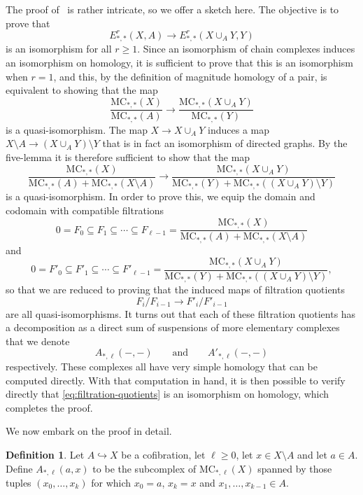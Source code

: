 \documentclass[a4paper, 11 pt, oneside, reqno]{amsart}
\numberwithin{lemma}{section}
\theoremstyle{definition}
\newtheorem{definition}[lemma]{Definition}
\newcommand{\MC}{\mathrm{MC}}
\begin{document}
The proof of~ is rather intricate, 
so we offer a sketch here. The objective is to prove that
\[
    E^r_{\ast,\ast}(X,A)\to E^r_{\ast,\ast}(X\cup_A Y,Y)
\]
is an isomorphism for all $r\geq 1$.
Since an isomorphism of chain complexes induces an isomorphism
on homology, 
it is sufficient to prove that this is an isomorphism when $r=1$,
and this, by the definition of magnitude homology of a pair,
is equivalent to showing that the map
\[
    \frac{\MC_{\ast,\ast}(X)}{\MC_{\ast,\ast}(A)}
    \longrightarrow
    \frac{\MC_{\ast,\ast}(X\cup_A Y)}{\MC_{\ast,\ast}(Y)}
\]
is a quasi-isomorphism.
The map $X\to X\cup_A Y$ induces a map
$X\setminus A\to (X\cup_A Y)\setminus Y$
that is in fact an isomorphism of directed graphs.
By the five-lemma it is therefore sufficient to show that the  map
\[
    \frac{\MC_{\ast,\ast}(X)}
    {\MC_{\ast,\ast}(A)+\MC_{\ast,\ast}(X\setminus A)}
    \longrightarrow
    \frac{\MC_{\ast,\ast}(X\cup_A Y)}{\MC_{\ast,\ast}(Y)
    +\MC_{\ast,\ast}((X\cup_A Y)\setminus Y)}
\]
is a quasi-isomorphism.
In order to prove this, we equip the domain and codomain with
compatible filtrations
\[
    0= F_0\subseteq F_1\subseteq \cdots\subseteq F_{\ell-1}=
    \frac{\MC_{\ast,\ast}(X)}
    {\MC_{\ast,\ast}(A)+\MC_{\ast,\ast}(X\setminus A)}
\]
and 
\[
    0=F'_0\subseteq F'_1\subseteq \cdots\subseteq F'_{\ell-1}=
    \frac{\MC_{\ast,\ast}(X\cup_A Y)}{\MC_{\ast,\ast}(Y)
    +\MC_{\ast,\ast}((X\cup_A Y)\setminus Y)},
\]
so that we are reduced to proving that the induced maps of filtration
quotients
\begin{equation}\label{eq:filtration-quotients}
    F_i/F_{i-1}\longrightarrow F'_i/F'_{i-1}
\end{equation}
are all quasi-isomorphisms.
It turns out that each of these filtration quotients has a decomposition 
as a direct sum of suspensions of more elementary complexes
that we denote 
\[
    A_{\ast,\ell}(-,-)
    \qquad\text{and}\qquad
    A'_{\ast,\ell}(-,-)
\]
respectively.
These complexes all have very 
simple homology that can be computed directly.
With that computation in hand, it is then possible 
to  verify directly that 
\eqref{eq:filtration-quotients} is an isomorphism on homology,
which completes the proof.

We now embark on the proof in detail.

\begin{definition}\label{definition-A}
    Let $A\hookrightarrow X$ be a cofibration,
    let $\ell\geq 0$, let $x\in X\setminus A$
    and let $a\in A$.
    Define $A_{\ast,\ell}(a,x)$ to be the subcomplex of
    $\MC_{\ast,\ell}(X)$ spanned by those tuples
    $(x_0,\ldots,x_k)$ 
    for which $x_0=a$, $x_k=x$ and $x_1,\ldots,x_{k-1}\in A$.
\end{definition}
\end{document}
